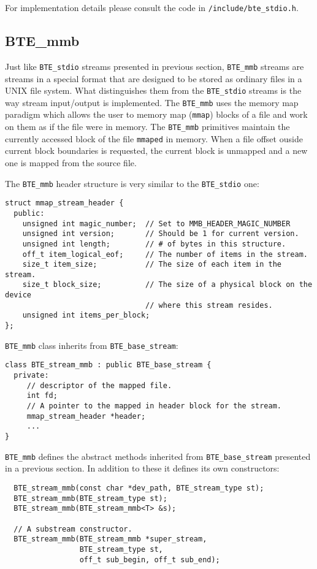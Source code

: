 For implementation details please consult the code in
\verb|/include/bte_stdio.h|.



\subsection{BTE\_mmb}

Just like \verb|BTE_stdio| streams presented in previous section,
\verb|BTE_mmb| streams are streams in a special format that are designed to
be stored as ordinary files in a UNIX file system. What distinguishes them
from the \verb|BTE_stdio| streams is the way stream input/output is
implemented. The \verb|BTE_mmb| uses the memory map paradigm which allows
the user to memory map (\verb|mmap|) blocks of a file and work on them as
if the file were in memory. The \verb|BTE_mmb| primitives maintain the
currently accessed block of the file \verb|mmaped| in memory. When a file
offset ouside current block boundaries is requested, the current block is
unmapped and a new one is mapped from the source file.

The \verb|BTE_mmb| header structure is very similar to the \verb|BTE_stdio|
one:
\begin{verbatim}
struct mmap_stream_header { 
  public:
    unsigned int magic_number;  // Set to MMB_HEADER_MAGIC_NUMBER
    unsigned int version;       // Should be 1 for current version.
    unsigned int length;        // # of bytes in this structure.
    off_t item_logical_eof;     // The number of items in the stream.
    size_t item_size;           // The size of each item in the stream.
    size_t block_size;          // The size of a physical block on the device
                                // where this stream resides.
    unsigned int items_per_block;
};
\end{verbatim}

\verb|BTE_mmb| class inherits from \verb|BTE_base_stream|:
\begin{verbatim}
class BTE_stream_mmb : public BTE_base_stream {
  private:
     // descriptor of the mapped file.  
     int fd;   
     // A pointer to the mapped in header block for the stream. 
     mmap_stream_header *header;
     ...
}  
\end{verbatim}

\verb|BTE_mmb| defines the abstract methods inherited from
\verb|BTE_base_stream| presented in a previous section. In addition to
these it defines its own constructors:
\begin{verbatim}
  BTE_stream_mmb(const char *dev_path, BTE_stream_type st); 
  BTE_stream_mmb(BTE_stream_type st); 
  BTE_stream_mmb(BTE_stream_mmb<T> &s); 
  
  // A substream constructor.
  BTE_stream_mmb(BTE_stream_mmb *super_stream,
                 BTE_stream_type st,
                 off_t sub_begin, off_t sub_end);
\end{verbatim}

